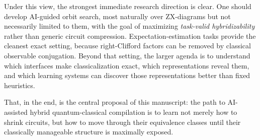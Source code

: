 \documentclass[11pt]{article}
\theoremstyle{remark}
\begin{document}
Under this view, the strongest immediate research direction is clear. One should develop AI-guided orbit search, most naturally over ZX-diagrams but not necessarily limited to them, with the goal of maximizing \emph{task-valid hybridizability} rather than generic circuit compression. Expectation-estimation tasks provide the cleanest exact setting, because right-Clifford factors can be removed by classical observable conjugation. Beyond that setting, the larger agenda is to understand which interfaces make classicalization exact, which representations reveal them, and which learning systems can discover those representations better than fixed heuristics.

That, in the end, is the central proposal of this manuscript: the path to AI-assisted hybrid quantum-classical compilation is to learn not merely how to shrink circuits, but how to move through their equivalence classes until their classically manageable structure is maximally exposed.
\end{document}
